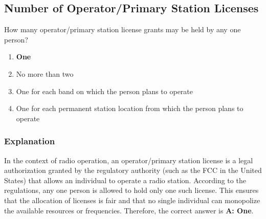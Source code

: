 \subsection{Number of Operator/Primary Station Licenses}
\label{T1A04}

\begin{tcolorbox}[colback=gray!10!white,colframe=black!75!black,title=T1A04]
How many operator/primary station license grants may be held by any one person?
\begin{enumerate}[label=\Alph*,noitemsep]
    \item \textbf{One}
    \item No more than two
    \item One for each band on which the person plans to operate
    \item One for each permanent station location from which the person plans to operate
\end{enumerate}
\end{tcolorbox}

\subsubsection*{Explanation}
In the context of radio operation, an operator/primary station license is a legal authorization granted by the regulatory authority (such as the FCC in the United States) that allows an individual to operate a radio station. According to the regulations, any one person is allowed to hold only one such license. This ensures that the allocation of licenses is fair and that no single individual can monopolize the available resources or frequencies. Therefore, the correct answer is \textbf{A: One}.